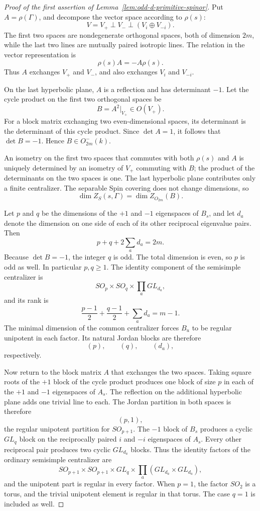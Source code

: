 \documentclass[11pt,a4paper]{article}
\theoremstyle{definition}
\theoremstyle{remark}
\begin{document}
\begin{proof}[Proof of the first assertion of
Lemma~\ref{lem:odd-d-primitive-spinor}]
Put \(A=\rho(\Gamma)\), and decompose the vector space according to
\(\rho(s)\):
\[
V=V_+\perp V_-\perp(V_i\oplus V_{-i}).
\]
The first two spaces are nondegenerate orthogonal spaces, both of
dimension \(2m\), while the last two lines are mutually paired isotropic
lines.  The relation in the vector representation is
\[
\rho(s)A=-A\rho(s).
\]
Thus \(A\) exchanges \(V_+\) and \(V_-\), and also exchanges \(V_i\) and
\(V_{-i}\).

On the last hyperbolic plane, \(A\) is a reflection and has determinant
\(-1\).  Let the cycle product on the first two orthogonal spaces be
\[
B=A^2|_{V_+}\in O(V_+).
\]
For a block matrix exchanging two even-dimensional spaces, its
determinant is the determinant of this cycle product.  Since
\(\det A=1\), it follows that \(\det B=-1\).  Hence
\(B\in O_{2m}^{-}(k)\).

An isometry on the first two spaces that commutes with both \(\rho(s)\)
and \(A\) is uniquely determined by an isometry of \(V_+\) commuting with
\(B\); the product of the determinants on the two spaces is one.
The last hyperbolic plane contributes only a finite centralizer.
The separable Spin covering does not change dimensions, so
\[
\dim Z_S(s,\Gamma)=\dim Z_{O_{2m}}(B).
\]

Let \(p\) and \(q\) be the dimensions of the \(+1\) and \(-1\)
eigenspaces of \(B_s\), and let \(d_a\) denote the dimension on one side
of each of its other reciprocal eigenvalue pairs.  Then
\[
p+q+2\sum_a d_a=2m.
\]
Because \(\det B=-1\), the integer \(q\) is odd.  The total dimension is
even, so \(p\) is odd as well.  In particular \(p,q\geq 1\).
The identity component of the semisimple centralizer is
\[
SO_p\times SO_q\times\prod_a GL_{d_a},
\]
and its rank is
\[
\frac{p-1}{2}+\frac{q-1}{2}+\sum_a d_a=m-1.
\]
The minimal dimension of the common centralizer forces \(B_u\) to be
regular unipotent in each factor.  Its natural Jordan blocks are
therefore
\[
(p),\qquad (q),\qquad (d_a),
\]
respectively.

Now return to the block matrix \(A\) that exchanges the two spaces.
Taking square roots of the \(+1\) block of the cycle product produces
one block of size \(p\) in each of the \(+1\) and \(-1\) eigenspaces of
\(A_s\).  The reflection on the additional hyperbolic plane adds one
trivial line to each.  The Jordan partition in both spaces is therefore
\[
(p,1),
\]
the regular unipotent partition for \(SO_{p+1}\).
The \(-1\) block of \(B_s\) produces a cyclic \(GL_q\) block on the
reciprocally paired \(i\) and \(-i\) eigenspaces of \(A_s\).
Every other reciprocal pair produces two cyclic \(GL_{d_a}\) blocks.
Thus the identity factors of the ordinary semisimple centralizer are
\[
SO_{p+1}\times SO_{p+1}\times GL_q
\times\prod_a(GL_{d_a}\times GL_{d_a}),
\]
and the unipotent part is regular in every factor.
When \(p=1\), the factor \(SO_2\) is a torus, and the trivial unipotent
element is regular in that torus.  The case \(q=1\) is included as well.


\end{proof}
\end{document}
